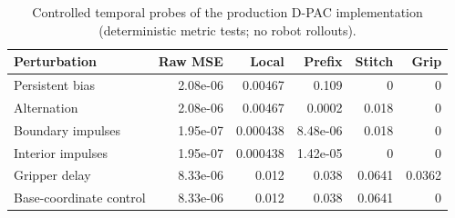 \begin{table}[t]
\centering
\caption{Controlled temporal probes of the production D-PAC implementation (deterministic metric tests; no robot rollouts).}
\label{tab:temporal_validation}
\footnotesize
\begin{tabular}{@{}lrrrrr@{}}
\toprule
Perturbation & Raw MSE & Local & Prefix & Stitch & Grip \\
\midrule
Persistent bias & 2.08e-06 & 0.00467 & 0.109 & 0 & 0 \\
Alternation & 2.08e-06 & 0.00467 & 0.0002 & 0.018 & 0 \\
Boundary impulses & 1.95e-07 & 0.000438 & 8.48e-06 & 0.018 & 0 \\
Interior impulses & 1.95e-07 & 0.000438 & 1.42e-05 & 0 & 0 \\
Gripper delay & 8.33e-06 & 0.012 & 0.038 & 0.0641 & 0.0362 \\
Base-coordinate control & 8.33e-06 & 0.012 & 0.038 & 0.0641 & 0 \\
\bottomrule
\end{tabular}
\end{table}
